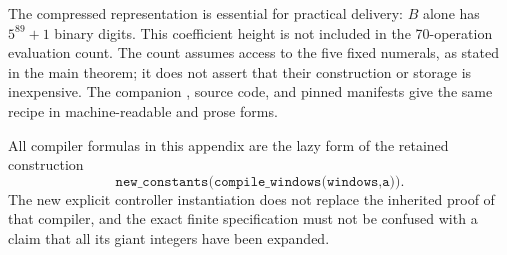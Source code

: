 The compressed representation is essential for practical delivery:
$B$ alone has $5^{89}+1$ binary digits. This coefficient height is not
included in the 70-operation evaluation count. The count assumes access
to the five fixed numerals, as stated in the main theorem; it does not
assert that their construction or storage is inexpensive. The companion
, source code, and pinned
manifests give the same recipe in machine-readable and prose forms.

All compiler formulas in this appendix are the lazy form of the retained
construction
\[
 \texttt{new\_constants(compile\_windows(windows,a))}.
\]
The new explicit controller instantiation does not replace the inherited
proof of that compiler, and the exact finite specification must not be
confused with a claim that all its giant integers have been expanded.
